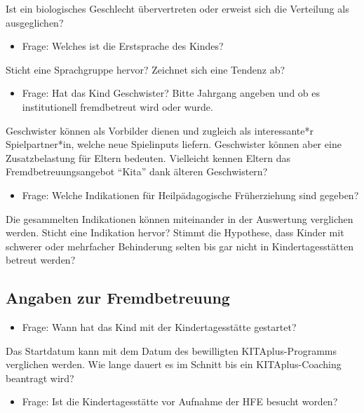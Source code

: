 \documentclass[
  ngerman,
  11pt,
  paper=a4,
  twoside,
  titlepage=true,
  openright,
  abstract=on,
  toc=listofnumbered,
  numbers=noenddot,
  chapterprefix=true,
  headings=optiontohead,
  svgnames,
  dvipsnames]{scrreprt}
\providecommand{\tightlist}{%
  \setlength{\itemsep}{0pt}\setlength{\parskip}{0pt}}
\begin{document}
Ist ein biologisches Geschlecht übervertreten oder erweist sich die
Verteilung als ausgeglichen?

\begin{itemize}
\tightlist
\item
  Frage: Welches ist die Erstsprache des Kindes?
\end{itemize}

Sticht eine Sprachgruppe hervor? Zeichnet sich eine Tendenz ab?

\begin{itemize}
\tightlist
\item
  Frage: Hat das Kind Geschwister? Bitte Jahrgang angeben und ob es
  institutionell fremdbetreut wird oder wurde.
\end{itemize}

Geschwister können als Vorbilder dienen und zugleich als interessante*r
Spielpartner*in, welche neue Spielinputs liefern. Geschwister können
aber eine Zusatzbelastung für Eltern bedeuten. Vielleicht kennen Eltern
das Fremdbetreuungsangebot “Kita” dank älteren Geschwistern?

\begin{itemize}
\tightlist
\item
  Frage: Welche Indikationen für Heilpädagogische Früherziehung sind
  gegeben?
\end{itemize}

Die gesammelten Indikationen können miteinander in der Auswertung
verglichen werden. Sticht eine Indikation hervor? Stimmt die Hypothese,
dass Kinder mit schwerer oder mehrfacher Behinderung selten bis gar
nicht in Kindertagesstätten betreut werden?

\hypertarget{sec:fremdbetreuungangaben}{%
\subsection{Angaben zur
Fremdbetreuung}\label{sec:fremdbetreuungangaben}}

\begin{itemize}
\tightlist
\item
  Frage: Wann hat das Kind mit der Kindertagesstätte gestartet?
\end{itemize}

Das Startdatum kann mit dem Datum des bewilligten KITAplus-Programms
verglichen werden. Wie lange dauert es im Schnitt bis ein
KITAplus-Coaching beantragt wird?

\begin{itemize}
\tightlist
\item
  Frage: Ist die Kindertagesstätte vor Aufnahme der HFE besucht worden?
\end{itemize}
\end{document}
